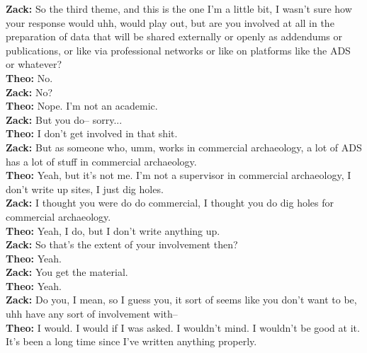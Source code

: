 \begin{arefs}
\item\label{A17}
\textbf{Zack:} So the third theme, and this is the one I'm a little bit, I wasn't sure how your response would uhh, would play out, but are you involved at all in the preparation of data that will be shared externally or openly as addendums or publications, or like via professional networks or like on platforms like the ADS or whatever?\\
\textbf{Theo:} No.\\
\textbf{Zack:} No?\\
\textbf{Theo:} Nope. I'm not an academic.\\
\textbf{Zack:} But you do-- sorry...\\
\textbf{Theo:} I don't get involved in that shit.\\
\textbf{Zack:} But as someone who, umm, works in commercial archaeology, a lot of ADS has a lot of stuff in commercial archaeology.\\
\textbf{Theo:} Yeah, but it's not me. I'm not a supervisor in commercial archaeology, I don't write up sites, I just dig holes.\\
\textbf{Zack:} I thought you were do do commercial, I thought you do dig holes for commercial archaeology.\\
\textbf{Theo:} Yeah, I do, but I don't write anything up.\\
\textbf{Zack:} So that's the extent of your involvement then?\\
\textbf{Theo:} Yeah.\\
\textbf{Zack:} You get the material.\\
\textbf{Theo:} Yeah.\\
\textbf{Zack:} Do you, I mean, so I guess you, it sort of seems like you don't want to be, uhh have any sort of involvement with--\\
\textbf{Theo:} I would. I would if I was asked. I wouldn't mind. I wouldn't be good at it. It's been a long time since I've written anything properly.


\end{arefs}
